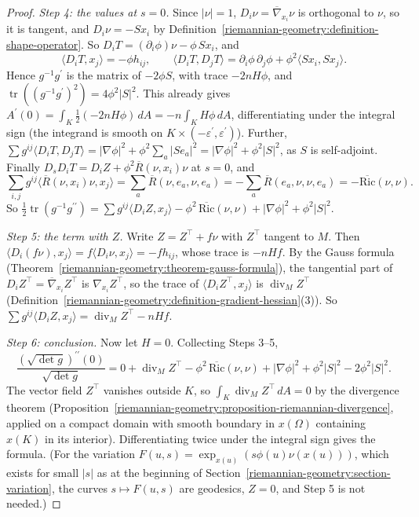\begin{proof}
\emph{Step 4: the values at $s = 0$.} Since $|\nu| = 1$, $D_i\nu = \overline{\nabla}_{x_i}\nu$ is orthogonal to $\nu$, so it is tangent, and $D_i\nu = -Sx_i$ by
Definition~\ref{riemannian-geometry:definition-shape-operator}. So $D_iT = (\partial_i\phi)\nu - \phi\,Sx_i$, and
\[
\langle D_iT, x_j\rangle = -\phi h_{ij}, \qquad \langle D_iT, D_jT\rangle = \partial_i\phi\,\partial_j\phi + \phi^2\langle Sx_i, Sx_j\rangle .
\]
Hence $g^{-1}g^{\prime}$ is the matrix of $-2\phi S$, with trace $-2nH\phi$, and $\operatorname{tr}((g^{-1}g^{\prime})^2) = 4\phi^2|S|^2$. This already gives
$A^{\prime}(0) = \int_K\frac12(-2nH\phi)\,dA = -n\int_KH\phi\,dA$, differentiating under the integral sign (the integrand is smooth on $K \times (-\varepsilon^{\prime}, \varepsilon^{\prime})$). Further,
$\sum g^{ij}\langle D_iT, D_jT\rangle = |\nabla\phi|^2 + \phi^2\sum_a|Se_a|^2 = |\nabla\phi|^2 + \phi^2|S|^2$, as $S$ is self-adjoint. Finally
$D_sD_iT = D_iZ + \phi^2\overline{R}(\nu, x_i)\nu$ at $s = 0$, and
\[
\sum_{i,j}g^{ij}\langle\overline{R}(\nu, x_i)\nu, x_j\rangle = \sum_a\overline{R}(\nu, e_a, \nu, e_a) = -\sum_a\overline{R}(e_a, \nu, \nu, e_a) = -\overline{\mathrm{Ric}}(\nu, \nu).
\]
So $\frac12\operatorname{tr}(g^{-1}g^{\prime\prime}) = \sum g^{ij}\langle D_iZ, x_j\rangle - \phi^2\,\overline{\mathrm{Ric}}(\nu, \nu) + |\nabla\phi|^2 + \phi^2|S|^2$.

\emph{Step 5: the term with $Z$.} Write $Z = Z^\top + f\nu$ with $Z^\top$ tangent to $M$. Then $\langle D_i(f\nu), x_j\rangle = f\langle D_i\nu, x_j\rangle = -fh_{ij}$, whose trace is
$-nHf$. By the Gauss formula (Theorem~\ref{riemannian-geometry:theorem-gauss-formula}), the tangential part of $D_iZ^\top = \overline{\nabla}_{x_i}Z^\top$ is $\nabla_{x_i}Z^\top$, so the trace
of $\langle D_iZ^\top, x_j\rangle$ is $\operatorname{div}_MZ^\top$ (Definition~\ref{riemannian-geometry:definition-gradient-hessian}(3)). So $\sum g^{ij}\langle D_iZ, x_j\rangle = \operatorname{div}_MZ^\top - nHf$.

\emph{Step 6: conclusion.} Now let $H = 0$. Collecting Steps 3--5,
\[
\frac{(\sqrt{\det g})^{\prime\prime}(0)}{\sqrt{\det g}} = 0 + \operatorname{div}_MZ^\top - \phi^2\,\overline{\mathrm{Ric}}(\nu, \nu) + |\nabla\phi|^2 + \phi^2|S|^2 - 2\phi^2|S|^2 .
\]
The vector field $Z^\top$ vanishes outside $K$, so $\int_K\operatorname{div}_MZ^\top\,dA = 0$ by the divergence theorem
(Proposition~\ref{riemannian-geometry:proposition-riemannian-divergence}, applied on a compact domain with smooth boundary in $x(\Omega)$ containing $x(K)$ in its interior). Differentiating
twice under the integral sign gives the formula. (For the variation $F(u, s) = \exp_{x(u)}(s\phi(u)\nu(x(u)))$, which exists for small $|s|$ as at the beginning of
Section~\ref{riemannian-geometry:section-variation}, the curves $s \mapsto F(u, s)$ are geodesics, $Z = 0$, and Step 5 is not needed.)
\end{proof}

